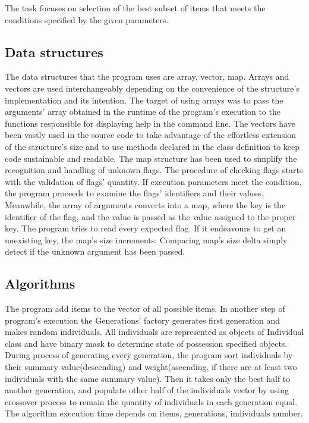 \documentclass[12pt,a4paper,twoside]{article}
\let\oldmarginpar\marginpar
\renewcommand\marginpar[1]{%
  {\linespread{0.85}\normalfont\scriptsize%
\oldmarginpar[\hspace{1cm}\begin{minipage}{3cm}\raggedleft\scriptsize\color{black}\textsf{#1}\end{minipage}]%
{\hspace{0cm}\begin{minipage}{3cm}\raggedright\scriptsize\color{black}\textsf{#1}\end{minipage}}%
}%
}
\begin{document}
The task focuses on selection of the best subset of items that meets the conditions specified by the given parameters.

\subsection{Data structures}
The data structures that the program uses are array, vector, map. Arrays and vectors are used interchangeably depending on the convenience of the structure's implementation and its intention. 
The target of using arrays was to pass the arguments' array obtained in the runtime of the program's execution to the functions responsible for displaying help in the command line.
The vectors have been vastly used in the source code to take advantage of the effortless extension of the structure's size and to use methods declared in the class definition to keep code sustainable and readable.
The map structure has been used to simplify the recognition and handling of unknown flags. The procedure of checking flags starts with the validation of flags' quantity. If execution parameters meet the condition, the program proceeds to examine the flags' identifiers and their values. Meanwhile, the array of arguments converts into a map, where the key is the identifier of the flag, and the value is passed as the value assigned to the proper key. The program tries to read every expected flag. If it endeavours to get an unexisting key, the map's size increments. Comparing map's size delta simply detect if the unknown argument has been passed.

\subsection{Algorithms}
The program add items to the vector of all possible items. In another step of program's execution the Generations' factory generates first generation and makes random individuals. All individuals are represented as objects of Individual class and have binary mask to determine state of possession specified objects. During process of generating every generation, the program sort individuals by their summary value(descending) and weight(ascending, if there are at least two individuals with the same summary value). Then it takes only the best half to another generation, and populate other half of the individuals vector by using crossover process to remain the quantity of individuals in each generation equal. The algorithm execution time depends on items, generations, individuals number.
\end{document}
